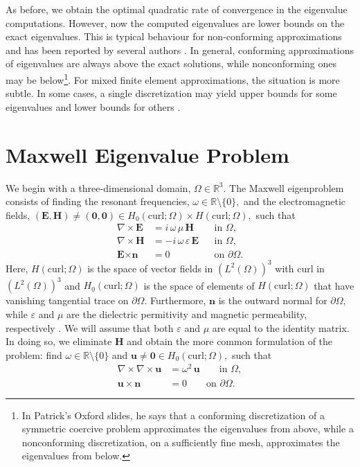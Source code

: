 \documentclass[12pt,a4paper]{article}
\theoremstyle{boldthm}
\theoremstyle{bolddefn}
\begin{document}
As before, we obtain the optimal quadratic rate of convergence in the eigenvalue computations. However, now the computed eigenvalues are lower bounds on the exact eigenvalues. This is typical behaviour for non-conforming approximations and has been reported by several authors \cite{boffi}. In general, conforming approximations of eigenvalues are always above the exact solutions, while nonconforming ones may be below\footnote{In Patrick's Oxford slides, he says that a conforming discretization of a symmetric coercive problem approximates the eigenvalues from above, while a nonconforming discretization, on a sufficiently fine mesh, approximates the eigenvalues from below.}.
For mixed finite element approximations, the situation is more subtle. In some cases, a single discretization may yield upper bounds for some eigenvalues and lower bounds for others \cite{boffi}.

\section{Maxwell Eigenvalue Problem}

We begin with a three-dimensional domain, $\Omega \in \mathbb{R}^3.$ The Maxwell eigenproblem consists of finding the resonant frequencies, $\omega \in \mathbb{R} \setminus \{0\},$ and the electromagnetic fields, $(\mathbf{E}, \mathbf{H}) \ne (\mathbf{0}, \mathbf{0}) \in H_0(\text{curl} ; \Omega) \times H(\text{curl}; \Omega), $ such that
\begin{equation}
\begin{aligned}
\nabla \times \mathbf{E} &= i \, \omega \,  \mu \, \textbf{H}
&& \text{in } \Omega, \\
\nabla \times \textbf{H} &= -i \, \omega \, \varepsilon \, \textbf{E}
&& \text{in } \Omega, \\
\textbf{E} \times \textbf{n} &= 0
&& \text{on } \partial\Omega .
\end{aligned}
\end{equation}
Here, $H(\text{curl}; \Omega)$ is the space of vector fields in $(L^2(\Omega))^3$ with curl in $(L^2(\Omega))^3$ and $H_0(\text{curl}; \Omega)$ is the space of elements of $H(\text{curl}; \Omega)$ that have vanishing tangential trace on $\partial \Omega.$ Furthermore, $\textbf{n}$ is the outward normal for $\partial \Omega,$ while
$\varepsilon$ and $\mu$ are the dielectric permitivity and magnetic permeability, respectively \cite{boffi}. We will assume that both $\varepsilon$ and $\mu$ are equal to the identity matrix. In doing so, we eliminate $\mathbf{H}$ and obtain the more common formulation of the problem: find $\omega \in \mathbb{R} \setminus \{0\}$ and $\mathbf{u} \ne \mathbf{0} \in H_0(\text{curl}; \Omega),$ such that
\begin{equation}
\begin{aligned}
    \nabla \times \nabla \times \mathbf{u}
 &=
\omega^2 \, \mathbf{u}  
\qquad \text{in } \Omega, \\
\mathbf{u}\times \textbf{n} &= 0
\qquad \text{on } \partial\Omega .
\end{aligned}
\end{equation}
\end{document}
